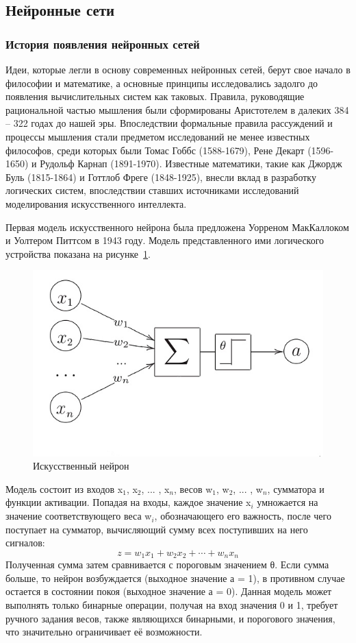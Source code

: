 \subsection{Нейронные сети}
 
 \subsubsection{История появления нейронных сетей}
 
 Идеи, которые легли в основу современных нейронных сетей, берут свое начало в философии и математике, а основные принципы исследовались задолго до появления вычислительных систем как таковых. Правила, руководящие рациональной частью мышления были сформированы Аристотелем в далеких 384 -- 322 годах до нашей эры. Впоследствии формальные правила рассуждений и процессы мышления стали предметом исследований не менее известных философов, среди которых были Томас Гоббс (1588-1679),  Рене Декарт (1596-1650) и Рудольф Карнап (1891-1970)\cite{nn_history}. Известные математики, такие как Джордж Буль (1815-1864) и Готтлоб Фреге (1848-1925), внесли вклад в разработку логических систем, впоследствии ставших источниками исследований моделирования искусственного интеллекта. 
 
 Первая модель искусственного нейрона была предложена Уорреном МакКаллоком и Уолтером Питтсом в 1943 году. Модель представленного ими логического устройства показана на рисунке~\ref{fig:neuron}.
 
 \begin{figure}[h]
	\centering
	\includegraphics[width=0.7\linewidth]{images/neuron}
	\caption[]{Искусственный нейрон}
	\label{fig:neuron}
\end{figure}

Модель состоит из входов x$_{1}$, x$_{2}$, ... , x$_{n}$, весов w$_{1}$, w$_{2}$, ... , w$_{n}$, сумматора и функции активации. Попадая на входы, каждое значение x$_{i}$ умножается на значение соответствующего веса w$_{i}$, обозначающего его важность, после чего поступает на сумматор, вычисляющий сумму всех поступивших на него сигналов:
\[
z = w_1 x_1 + w_2 x_2 + \cdots + w_n x_n
\]
Полученная сумма затем сравнивается с пороговым значением θ. Если сумма больше, то нейрон возбуждается (выходное значение а = 1), в противном случае остается в состоянии покоя (выходное значение а = 0). Данная модель может выполнять только бинарные операции, получая на вход значения 0 и 1, требует ручного задания весов, также являющихся бинарными, и порогового значения, что значительно ограничивает её возможности. 

